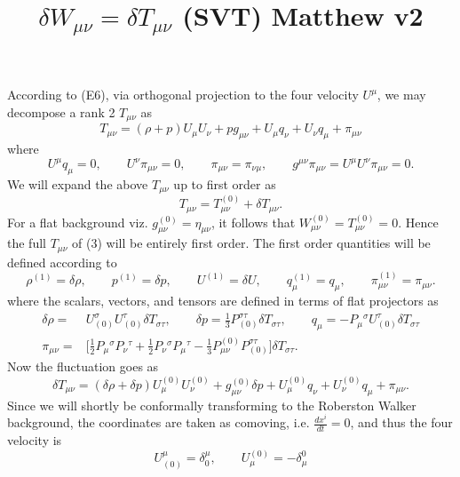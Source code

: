 \documentclass[10pt,letterpaper]{article}
\title{$\delta W_{\mu\nu} = \delta T_{\mu\nu}$ (SVT) Matthew v2}
\date{}
\begin{document}
\maketitle
\noindent 
According to (E6), via orthogonal projection to the four velocity $U^\mu$, we may decompose a rank 2 $T_{\mu\nu}$ as
\begin{equation}
T_{\mu\nu} = (\rho+p)U_\mu U_\nu + p g_{\mu\nu} + U_\mu q_\nu + U_\nu q_\mu + \pi_{\mu\nu}
\end{equation}
where
\begin{equation}
	U^\mu q_{\mu} = 0,\qquad U^\nu \pi_{\mu\nu} = 0,\qquad \pi_{\mu\nu} = \pi_{\nu\mu},\qquad g^{\mu\nu}\pi_{\mu\nu} =U^\mu U^\nu \pi_{\mu\nu} = 0.
\end{equation}
We will expand the above $T_{\mu\nu}$ up to first order as
\begin{equation}
	T_{\mu\nu} = T_{\mu\nu}^{(0)} + \delta T_{\mu\nu}.
\end{equation}
For a flat background viz. $g_{\mu\nu}^{(0)} = \eta_{\mu\nu}$, it follows that $W_{\mu\nu}^{(0)} = T_{\mu\nu}^{(0)} = 0$. Hence the full $T_{\mu\nu}$ of (3) will be entirely first order. The first order quantities will be defined according to 
\begin{equation}
\rho^{(1)} = \delta \rho,\qquad p^{(1)} = \delta p,\qquad U^{(1)} = \delta U,\qquad q_\mu^{(1)} = q_\mu,\qquad \pi_{\mu\nu}^{(1)} = \pi_{\mu\nu}.
\end{equation}
where the scalars, vectors, and tensors are defined in terms of flat projectors as
\begin{align}
	\delta \rho =&{}  U_{(0)}^\sigma U_{(0)}^\tau \delta T_{\sigma\tau},\qquad \delta p =  \frac{1}{3} P_{(0)}^{\sigma\tau} \delta T_{\sigma\tau},\qquad
	q_\mu = -P_\mu{}^\sigma U_{(0)}^{\tau}\delta T_{\sigma\tau}\nonumber\\
	\pi_{\mu\nu} =&{} \bigg[ \frac12 P_\mu{}^\sigma P_\nu{}^\tau + \frac12 P_{\nu}{}^\sigma  P_\mu{}^\tau- \frac13 P_{\mu\nu}^{(0)}P_{(0)}^{\sigma\tau}\bigg]\delta T_{\sigma\tau}.
\end{align}
Now the fluctuation goes as
\begin{equation}
	\delta T_{\mu\nu} = (\delta \rho + \delta p)U^{(0)}_{\mu}U^{(0)}_{\nu} + g_{\mu\nu}^{(0)}\delta p  + U_\mu^{(0)}q_\nu + U_\nu^{(0)}q_\mu + \pi_{\mu\nu}.
\end{equation}
Since we will shortly be conformally transforming to the Roberston Walker background, the coordinates are taken as comoving, i.e. $\frac{ dx^i}{dt} = 0$, and thus the four velocity is
\begin{equation}
	U_{(0)}^\mu =  \delta^\mu_0,\qquad U_\mu^{(0)} =- \delta_\mu^0
\end{equation}
\end{document}
